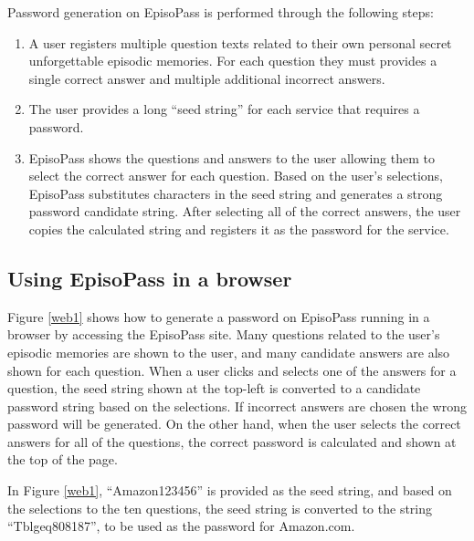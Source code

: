 \documentclass[runningheads,a4paper]{llncs}
\begin{document}
Password generation on EpisoPass is performed through the following steps:

\begin{enumerate}
\item A user registers multiple question texts related to their own personal
secret unforgettable episodic memories. For each question they must provides
a single correct answer and multiple additional incorrect answers.

\item The user provides a long ``seed string'' for each service that requires
a password.

\item EpisoPass shows the questions and answers to the user allowing
them to select the correct answer for each question.
Based on the user's selections,
EpisoPass substitutes characters in the seed string and generates a
strong password candidate string.
After selecting all of the correct answers,
the user copies the calculated string
and registers it as the password for the service.
\end{enumerate}

\subsection{Using EpisoPass in a browser}

Figure \ref{web1} shows how to generate a password
on EpisoPass running in a browser by accessing the EpisoPass site.
Many questions related to the user's episodic memories are shown to the user,
and many candidate answers are also shown for each question.
When a user clicks and selects one of the answers for a question,
the seed string shown at the top-left is converted to a
candidate password string based on the selections. If incorrect answers are chosen the wrong password will be generated. On the other hand, when the user selects the correct answers for all of the questions,
the correct password is calculated and shown at the top of the page.


In Figure \ref{web1},
``\textsf{Amazon123456}'' is provided as the seed string,
and based on the selections to the ten questions,
the seed string is converted to the string
``\textsf{Tblgeq808187}'',
to be used as the password for Amazon.com.
\end{document}

